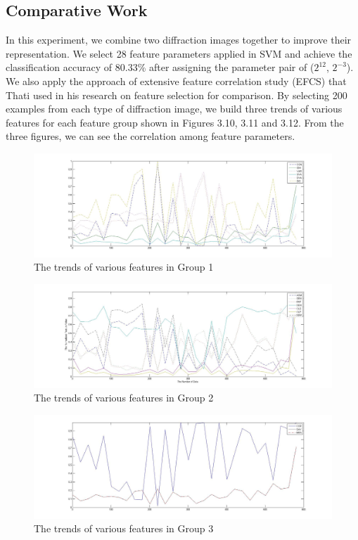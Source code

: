 \subsection{Comparative Work}
In this experiment, we combine two diffraction images together to improve their representation. We select 28 feature parameters applied in SVM and achieve the classification accuracy of 80.33\% after assigning the parameter pair of ($2^{12}$, $2^{-3}$). We also apply the approach of extensive feature correlation study (EFCS) that Thati used in his research on feature selection\cite{Thati} for comparison. By selecting 200 examples from each type of diffraction image, we build three trends of various features for each feature group shown in Figures 3.10, 3.11 and 3.12. From the three figures, we can see the correlation among feature parameters. 
\begin{figure}
\includegraphics[width=\linewidth]{p_feature_group1}
\caption{The trends of various features in Group 1}
\end{figure}
\begin{figure}
\includegraphics[width=\linewidth]{p_feature_group2}
\caption{The trends of various features in Group 2}
\end{figure}
\begin{figure}[!t]
\includegraphics[width=\linewidth]{p_feature_group3}
\caption{The trends of various features in Group 3}
\end{figure}
